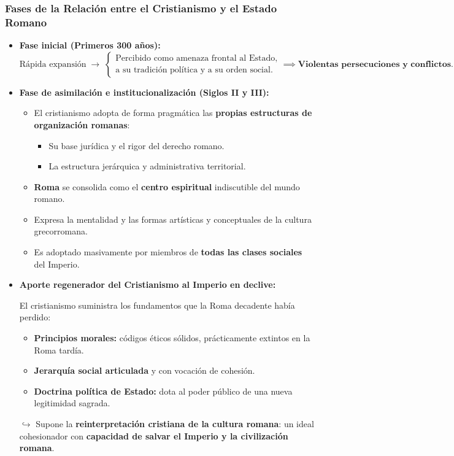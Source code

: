 \documentclass[11pt,letterpaper]{article}
\begin{document}
\subsubsection{Fases de la Relación entre el Cristianismo y el Estado Romano}
\begin{itemize}
  \item \textbf{Fase inicial (Primeros 300 años):}
  \[
    \text{Rápida expansión} \;\longrightarrow\; \begin{cases}
      \text{Percibido como amenaza frontal al Estado,} \\
      \text{a su tradición política y a su orden social.}
    \end{cases} \implies \textbf{Violentas persecuciones y conflictos.}
  \]
  \item \textbf{Fase de asimilación e institucionalización (Siglos II y III):}
  \begin{itemize}
    \item El cristianismo adopta de forma pragmática las \textbf{propias estructuras de organización romanas}:
    \begin{itemize}
      \item Su base jurídica y el rigor del derecho romano.
      \item La estructura jerárquica y administrativa territorial.
    \end{itemize}
    \item \textbf{Roma} se consolida como el \textbf{centro espiritual} indiscutible del mundo romano.
    \item Expresa la mentalidad y las formas artísticas y conceptuales de la cultura grecorromana.
    \item Es adoptado masivamente por miembros de \textbf{todas las clases sociales} del Imperio.
  \end{itemize}
  \item \textbf{Aporte regenerador del Cristianismo al Imperio en declive:}
  \begin{subbox}
    El cristianismo suministra los fundamentos que la Roma decadente había perdido:
    \begin{itemize}
      \item \textbf{Principios morales:} códigos éticos sólidos, prácticamente extintos en la Roma tardía.
      \item \textbf{Jerarquía social articulada} y con vocación de cohesión.
      \item \textbf{Doctrina política de Estado:} dota al poder público de una nueva legitimidad sagrada.
    \end{itemize}
    $\hookrightarrow$ Supone la \textbf{reinterpretación cristiana de la cultura romana}: un ideal cohesionador con \textbf{capacidad de salvar el Imperio y la civilización romana}.
  \end{subbox}
\end{itemize}
\end{document}
